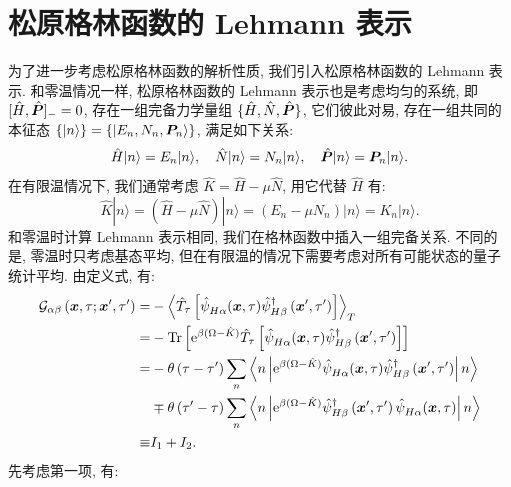 \section{松原格林函数的 Lehmann 表示}
为了进一步考虑松原格林函数的解析性质, 我们引入松原格林函数的 Lehmann 表示. 和零温情况一样, 松原格林函数的 Lehmann 表示也是考虑均匀的系统, 即$[\hat{H}, \hat{\boldsymbol{P}}]_{-}=0$, 存在一组完备力学量组 $\{\hat{H}, \hat{N}, \hat{\boldsymbol{P}}\}$, 它们彼此对易, 存在一组共同的本征态 $\{|n\rangle\}=\left\{\left|E_n, N_n, \boldsymbol{P}_n\right\rangle\right\}$, 满足如下关系:
\begin{equation}
\hat{H}|n\rangle=E_n|n\rangle, \quad \hat{N}|n\rangle=N_n|n\rangle, \quad \hat{\boldsymbol{P}}|n\rangle=\boldsymbol{P}_n|n\rangle.
\end{equation}
在有限温情况下, 我们通常考虑 $\hat{K}=\hat{H}-\mu \hat{N}$, 用它代替 $\hat{H}$ 有:
\begin{equation}
\hat{K}|n\rangle=(\hat{H}-\mu \hat{N})|n\rangle=\left(E_n-\mu N_n\right)|n\rangle=K_n|n\rangle .
\end{equation}
和零温时计算 Lehmann 表示相同, 我们在格林函数中插入一组完备关系. 不同的是, 零温时只考虑基态平均, 但在有限温的情况下需要考虑对所有可能状态的量子统计平均. 由定义式, 有:
\begin{align}
\mathcal{G}_{\alpha \beta}\left(\boldsymbol{x}, \tau ; \boldsymbol{x}^{\prime}, \tau^{\prime}\right)= & -\left\langle\hat{T}_\tau\left[\hat{\psi}^{}_{H \alpha}(\boldsymbol{x}, \tau) \hat{\psi}_{H \beta}^{\dagger}\left(\boldsymbol{x}^{\prime}, \tau^{\prime}\right)\right]\right\rangle_T \nonumber\\
= & -\operatorname{Tr}\left[\mathrm{e}^{\beta(\Omega-\hat{K})} \hat{T}_\tau\left[\hat{\psi}^{}_{H \alpha}(\boldsymbol{x}, \tau) \hat{\psi}_{H \beta}^{\dagger}\left(\boldsymbol{x}^{\prime}, \tau^{\prime}\right)\right]\right]\nonumber \\
= & -\theta\left(\tau-\tau^{\prime}\right) \sum_n\left\langle n\left|\mathrm{e}^{\beta(\Omega-\hat{K})} \hat{\psi}^{}_{H \alpha}(\boldsymbol{x}, \tau) \hat{\psi}_{H \beta}^{\dagger}\left(\boldsymbol{x}^{\prime}, \tau^{\prime}\right)\right| n\right\rangle\nonumber \\
& \mp \theta\left(\tau^{\prime}-\tau\right) \sum_n\left\langle n\left|\mathrm{e}^{\beta(\Omega-\hat{K})} \hat{\psi}^{\dagger}_{H \beta}\left(\boldsymbol{x}^{\prime}, \tau^{\prime}\right) \hat{\psi}^{}_{H\alpha}(\boldsymbol{x}, \tau)\right| n\right\rangle \nonumber\\
\equiv & I_1+I_2 .
\end{align}
先考虑第一项, 有:

